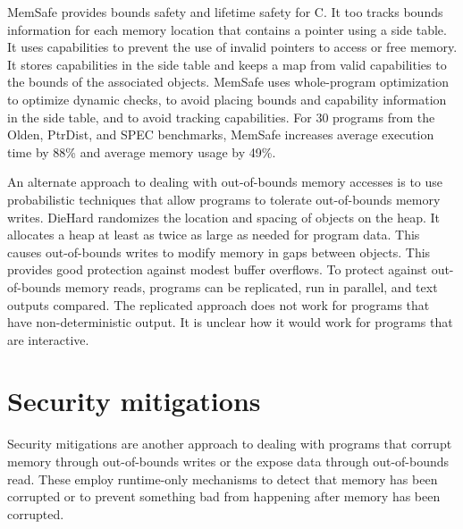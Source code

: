 MemSafe \cite{Simpson2013} provides bounds safety and lifetime safety for C.
It too tracks bounds information for each memory location that contains a 
pointer using a side table.  It uses capabilities to prevent the use of
invalid pointers to access or free memory.  It stores capabilities in the side 
table and keeps a map from valid capabilities to the bounds of the associated objects.
MemSafe uses whole-program optimization to optimize dynamic checks, to avoid placing bounds and capability information in the side table, and to avoid tracking 
capabilities. For 30 programs from the Olden, 
PtrDist, and SPEC benchmarks, MemSafe increases average execution time by 88\%
and average memory usage by 49\%.

An alternate approach to dealing with out-of-bounds memory accesses is to
use probabilistic techniques that allow programs to tolerate out-of-bounds
memory writes.   DieHard \cite{Berger2006} randomizes the location and spacing of 
objects on the heap.  It allocates a heap at least as twice as large as needed for
program data.    This causes out-of-bounds writes to modify memory in gaps
between objects.  This provides good protection against modest buffer overflows. 
To protect against out-of-bounds memory reads, programs
can be replicated, run in parallel, and text outputs compared.  The replicated
approach does not work for programs that have non-deterministic output. It is 
unclear how it would work for programs that are interactive.

\section{Security mitigations}
Security mitigations are another approach to dealing with programs that corrupt memory
through out-of-bounds writes or the expose data through out-of-bounds
read.   These employ runtime-only mechanisms to detect that memory has been
corrupted or to prevent something bad from happening after memory has been
corrupted.

